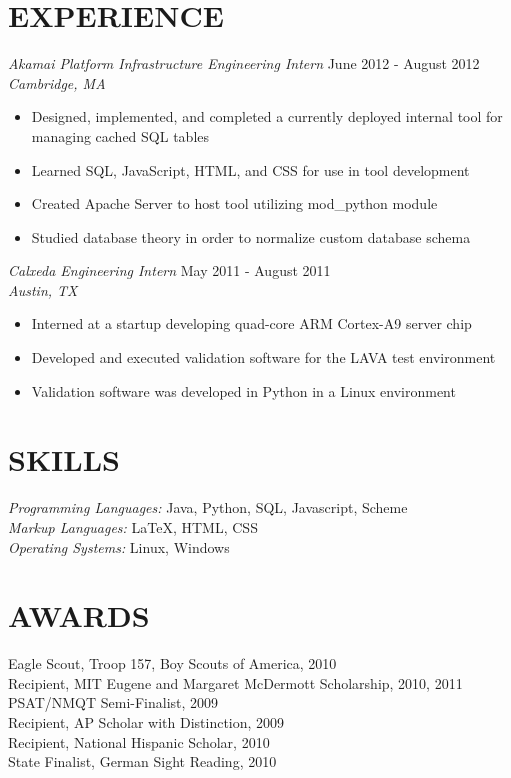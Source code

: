 \documentclass[margin]{res}
\begin{document}
\begin{resume}
                

\section{EXPERIENCE} {\sl Akamai Platform Infrastructure Engineering Intern} \hfill June 2012 -  August 2012 \\
                    {\sl Cambridge, MA}
                 \begin{itemize}  \itemsep -2pt %
                         \item  Designed, implemented, and completed a currently deployed internal tool for managing cached SQL tables
                         \item Learned SQL, JavaScript, HTML, and CSS for use in tool development
                         \item Created Apache Server to host tool utilizing mod\_python module 
                         \item Studied database theory in order to normalize custom database schema
                \end{itemize}

                {\sl Calxeda Engineering Intern} \hfill            May 2011 - August 2011 \\
                {\sl Austin, TX}
                 \begin{itemize}  \itemsep -2pt %
                                \item  Interned at a startup developing quad-core ARM Cortex-A9 server chip
                                \item Developed and executed validation software for the LAVA test environment
                                \item Validation software was developed in Python in a Linux environment
                 \end{itemize} 
 
\section{SKILLS} {\sl Programming Languages:} Java, Python, SQL, Javascript, Scheme \\
                 {\sl Markup Languages:} \LaTeX, HTML, CSS \\
                {\sl Operating Systems:} Linux, Windows
 
 
\section{AWARDS} Eagle Scout, Troop 157, Boy Scouts of America, 2010\\
        Recipient, MIT Eugene and Margaret McDermott Scholarship, 2010, 2011\\ 
        PSAT/NMQT Semi-Finalist, 2009 \\
        Recipient, AP Scholar with Distinction, 2009 \\ 
        Recipient, National Hispanic Scholar, 2010 \\
        State Finalist, German Sight Reading, 2010 \\


\end{resume}
\end{document}

